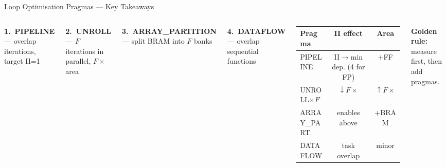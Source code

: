 \documentclass[aspectratio=169,12pt]{beamer}
\begin{document}
\begin{frame}{Loop Optimisation Pragmas --- Key Takeaways}
\vspace{0.15cm}
\begin{columns}[T,totalwidth=\textwidth]

  \colorbox{Navy!8}{\parbox{\dimexpr\linewidth-2\fboxsep\relax}{\vspace{4pt}
    \textbf{\color{Navy}1.\ PIPELINE} --- overlap iterations, target II=1
  \vspace{4pt}}}
  \vspace{5pt}

  \colorbox{Teal!10}{\parbox{\dimexpr\linewidth-2\fboxsep\relax}{\vspace{4pt}
    \textbf{\color{Teal}2.\ UNROLL} --- $F$ iterations in parallel, $F\times$ area
  \vspace{4pt}}}
  \vspace{5pt}

  \colorbox{Orange!10}{\parbox{\dimexpr\linewidth-2\fboxsep\relax}{\vspace{4pt}
    \textbf{\color{Orange}3.\ ARRAY\_PARTITION} --- split BRAM into $F$ banks
  \vspace{4pt}}}
  \vspace{5pt}

  \colorbox{Navy!8}{\parbox{\dimexpr\linewidth-2\fboxsep\relax}{\vspace{4pt}
    \textbf{\color{Navy}4.\ DATAFLOW} --- overlap sequential functions
  \vspace{4pt}}}

  \vspace{0.2cm}
  \begin{tabular}{lcc}
    \hline
    \rowcolor{Navy!10}\textbf{Pragma} & \textbf{II effect} & \textbf{Area}\\
    \hline
    PIPELINE          & II$\to$min dep. (4 for FP) & $+$FF\\
    \rowcolor{Navy!5}UNROLL$\times F$ & $\downarrow F\times$ & $\uparrow F\times$\\
    ARRAY\_PART.      & enables above & +BRAM\\
    \rowcolor{Navy!5}DATAFLOW         & task overlap & minor\\
    \hline
  \end{tabular}

  \vspace{12pt}
  {\color{Orange}\bfseries Golden rule:} {\small measure first, then add pragmas.}
\end{columns}
\end{frame}
\end{document}
